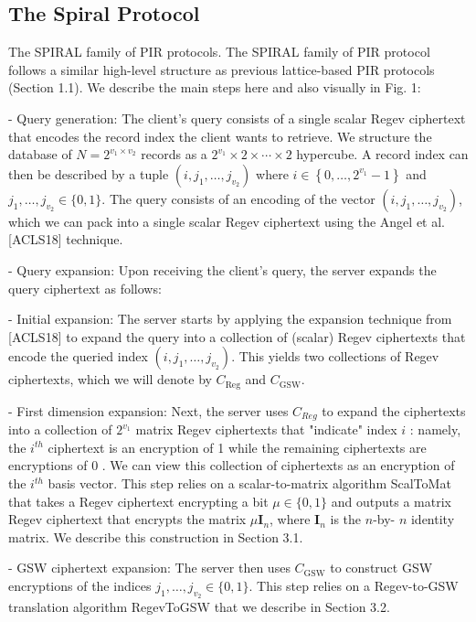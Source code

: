 \subsection{The Spiral Protocol}

The SPIRAL family of PIR protocols. The SPIRAL family of PIR protocol follows a similar high-level structure as previous lattice-based PIR protocols (Section 1.1). We describe the main steps here and also visually in Fig. 1:

- Query generation: The client's query consists of a single scalar Regev ciphertext that encodes the record index the client wants to retrieve. We structure the database of $N=2^{v_{1} \times v_{2}}$ records as a $2^{v_{1}} \times 2 \times \cdots \times 2$ hypercube. A record index can then be described by a tuple $\left(i, j_{1}, \ldots, j_{v_{2}}\right)$ where $i \in\left\{0, \ldots, 2^{v_{1}}-1\right\}$ and $j_{1}, \ldots, j_{v_{2}} \in\{0,1\}$. The query consists of an encoding of the vector $\left(i, j_{1}, \ldots, j_{v_{2}}\right)$, which we can pack into a single scalar Regev ciphertext using the Angel et al. [ACLS18] technique.

- Query expansion: Upon receiving the client's query, the server expands the query ciphertext as follows:

- Initial expansion: The server starts by applying the expansion technique from [ACLS18] to expand the query into a collection of (scalar) Regev ciphertexts that encode the queried index $\left(i, j_{1}, \ldots, j_{v_{2}}\right)$. This yields two collections of Regev ciphertexts, which we will denote by $C_{\mathrm{Reg}}$ and $C_{\mathrm{GSW}}$.

- First dimension expansion: Next, the server uses $C_{Reg}$ to expand the ciphertexts into a collection of $2^{v_{1}}$ matrix Regev ciphertexts that "indicate" index $i$ : namely, the $i^{th}$ ciphertext is an encryption of 1 while the remaining ciphertexts are encryptions of 0 . We can view this collection of ciphertexts as an encryption of the $i^{th}$ basis vector. This step relies on a scalar-to-matrix algorithm ScalToMat that takes a Regev ciphertext encrypting a bit $\mu \in\{0,1\}$ and outputs a matrix Regev ciphertext that encrypts the matrix $\mu \mathbf{I}_{n}$, where $\mathbf{I}_{n}$ is the $n$-by- $n$ identity matrix. We describe this construction in Section 3.1.

- GSW ciphertext expansion: The server then uses $C_{\mathrm{GSW}}$ to construct GSW
encryptions of the indices $j_{1}, \ldots, j_{v_{2}} \in\{0,1\}$. This step relies on a
Regev-to-GSW translation algorithm RegevToGSW that we describe in Section 3.2.

